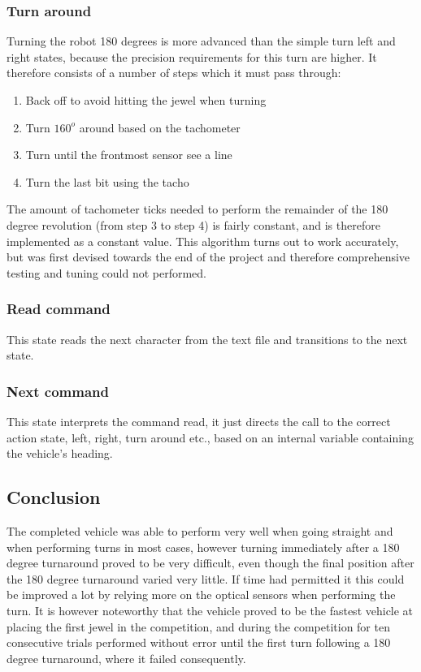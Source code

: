 \documentclass[final, english, a4paper]{article}
\begin{document}
	    \subsubsection{Turn around}
	        Turning the robot 180 degrees is more advanced than the simple turn left and right
	        states, because the precision requirements for this turn are
	        higher. It therefore consists of a number of steps which it must pass
	        through:
	        \begin{enumerate}
	            \item Back off to avoid hitting the jewel when turning
	            \item Turn $160^o$ around based on the tachometer
	            \item Turn until the frontmost sensor see a line
	            \item Turn the last bit using the tacho
	        \end{enumerate}
	        The amount of tachometer ticks needed to perform the remainder of the 180 degree revolution (from step 3 to step 4) is fairly constant, and is therefore implemented as a constant value.
	        This algorithm turns out to work accurately, but was first devised
	         towards the end of the project
	        and therefore comprehensive testing and tuning could not performed.
	    \subsubsection{Read command}
	        This state reads the next character from the text file and 
	        transitions to the next state.
	    \subsubsection{Next command}
	        This state interprets the command read, it just directs the call
	        to the correct action state, left, right, turn around etc., based on 
	        an internal variable containing the vehicle's heading. 

	\subsection{Conclusion} %
	    \label{robot:conclusion}
	   The completed vehicle was able to perform very well when going straight
	   and when performing turns in most cases, however turning immediately after a
	   180 degree turnaround proved to be very difficult, even though
	   the final position after the 180 degree turnaround varied very little.
       If time had permitted it this could be 
	   improved a lot by relying more on the optical sensors when performing the turn.
	   It is however noteworthy that the vehicle proved to be the fastest vehicle
	   at placing the first jewel in the competition, and during the competition for ten consecutive trials
	   performed without error until the first turn following a 180 degree turnaround, where it failed consequently.
\end{document}
